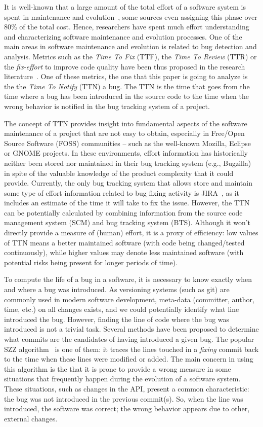 \documentclass[10pt, conference]{IEEEtran}
\begin{document}
It is well-known that a large amount of the total effort of a software system is spent in maintenance and evolution~\cite{tassey2002economic}, some sources even assigning this phase over 80\% of the total cost. Hence, researchers have spent much effort understanding and characterizing software maintenance and evolution processes. One of the main areas in software maintenance and evolution is related to bug detection and analysis. Metrics such as the \emph{Time To Fix} (TTF), the \emph{Time To Review} (TTR) or the \emph{fix-effort} to improve code quality have been thus proposed in the research literature~\cite{kim2006long}\cite{mockus2002two}. One of these metrics, the one that this paper is going to analyze is the the \emph{Time To Notify} (TTN) a bug. The TTN is the time that goes from the time where a bug has been introduced in the source code to the time when the wrong behavior is notified in the bug tracking system of a project. 

The concept of TTN provides insight into fundamental aspects of the software maintenance of a project that are not easy to obtain, especially in Free/Open Source Software (FOSS) communities -- such as the well-known Mozilla, Eclipse or GNOME projects. In these environments, effort information has historically neither been stored nor maintained in their bug tracking system (e.g., Bugzilla) in spite of the valuable knowledge of the product complexity that it  could provide. Currently, the only bug tracking system that allows store and maintain some type of effort information related to bug fixing activity is JIRA~\cite{weiss2007long}, as it includes an estimate of the time it will take to fix the issue. However, the TTN can be potentially calculated by combining information from the source code management system (SCM) and bug tracking system (BTS). Although it won't directly provide a measure of (human) effort, it is a proxy of efficiency: low values of TTN means a better maintained software (with code being changed/tested continuously), while higher values may denote less maintained software (with potential risks being present for longer periods of time).

To compute the life of a bug in a software, it is necessary to know exactly when and where a bug was introduced. As versioning systems (such as git) are commonly used in modern software development, meta-data (committer, author, time, etc.) on all changes exists, and we could potentially identify what line introduced the bug. However, finding the line of code where the bug was introduced is not a trivial task. Several methods have been proposed to determine what commits are the candidates of having introduced a given bug. The popular SZZ algorithm~\cite{sliwerski2005changes} is one of them: it traces the lines touched in a \emph{fixing} commit back to the time when these lines were modified or added. The main concern in using this algorithm is the that it is prone to provide a wrong measure in some situations that frequently happen during the evolution of a software system. These situations, such as changes in the API, present a common characteristic: the bug was not introduced in the previous commit(s). So, when the line was introduced, the software was correct; the wrong behavior appears due to other, external changes.
\end{document}
